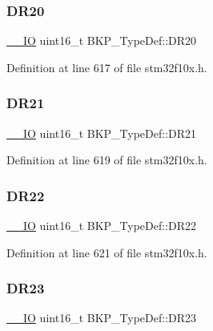 \subsubsection{\texorpdfstring{D\+R20}{DR20}}
{\footnotesize\ttfamily \hyperlink{core__sc300_8h_aec43007d9998a0a0e01faede4133d6be}{\+\_\+\+\_\+\+IO} uint16\+\_\+t B\+K\+P\+\_\+\+Type\+Def\+::\+D\+R20}



Definition at line 617 of file stm32f10x.\+h.

\mbox{\label{struct_b_k_p___type_def_a89180a525bf44cd1747dd97102de7a5a}} 
\subsubsection{\texorpdfstring{D\+R21}{DR21}}
{\footnotesize\ttfamily \hyperlink{core__sc300_8h_aec43007d9998a0a0e01faede4133d6be}{\+\_\+\+\_\+\+IO} uint16\+\_\+t B\+K\+P\+\_\+\+Type\+Def\+::\+D\+R21}



Definition at line 619 of file stm32f10x.\+h.

\mbox{\label{struct_b_k_p___type_def_a9f077d302b8fb5f113416919de36c1fb}} 
\subsubsection{\texorpdfstring{D\+R22}{DR22}}
{\footnotesize\ttfamily \hyperlink{core__sc300_8h_aec43007d9998a0a0e01faede4133d6be}{\+\_\+\+\_\+\+IO} uint16\+\_\+t B\+K\+P\+\_\+\+Type\+Def\+::\+D\+R22}



Definition at line 621 of file stm32f10x.\+h.

\mbox{\label{struct_b_k_p___type_def_a81ae6732bea9b86ebdad14e13e2fafcf}} 
\subsubsection{\texorpdfstring{D\+R23}{DR23}}
{\footnotesize\ttfamily \hyperlink{core__sc300_8h_aec43007d9998a0a0e01faede4133d6be}{\+\_\+\+\_\+\+IO} uint16\+\_\+t B\+K\+P\+\_\+\+Type\+Def\+::\+D\+R23}



